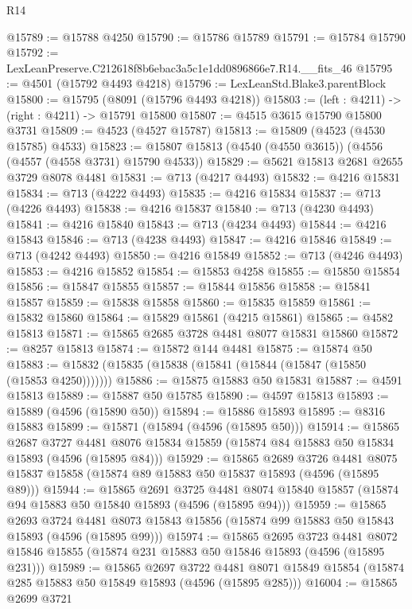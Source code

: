 \begin{lexlean}{R14}
\begin{coremodule}
@15789 := @15788 @4250
@15790 := @15786 @15789
@15791 := @15784 @15790
@15792 := LexLeanPreserve.C212618f8b6ebac3a5c1e1dd0896866e7.R14.__fits_46
@15795 := @4501 (@15792 @4493 @4218)
@15796 := LexLeanStd.Blake3.parentBlock
@15800 := @15795 (@8091 (@15796 @4493 @4218))
@15803 := (left : @4211) -> (right : @4211) -> @15791 @15800
@15807 := @4515 @3615 @15790 @15800 @3731
@15809 := @4523 (@4527 @15787)
@15813 := @15809 (@4523 (@4530 @15785) @4533)
@15823 := @15807 @15813 (@4540 (@4550 @3615)) (@4556 (@4557 (@4558 @3731) @15790 @4533))
@15829 := @5621 @15813 @2681 @2655 @3729 @8078 @4481
@15831 := @713 (@4217 @4493)
@15832 := @4216 @15831
@15834 := @713 (@4222 @4493)
@15835 := @4216 @15834
@15837 := @713 (@4226 @4493)
@15838 := @4216 @15837
@15840 := @713 (@4230 @4493)
@15841 := @4216 @15840
@15843 := @713 (@4234 @4493)
@15844 := @4216 @15843
@15846 := @713 (@4238 @4493)
@15847 := @4216 @15846
@15849 := @713 (@4242 @4493)
@15850 := @4216 @15849
@15852 := @713 (@4246 @4493)
@15853 := @4216 @15852
@15854 := @15853 @4258
@15855 := @15850 @15854
@15856 := @15847 @15855
@15857 := @15844 @15856
@15858 := @15841 @15857
@15859 := @15838 @15858
@15860 := @15835 @15859
@15861 := @15832 @15860
@15864 := @15829 @15861 (@4215 @15861)
@15865 := @4582 @15813
@15871 := @15865 @2685 @3728 @4481 @8077 @15831 @15860
@15872 := @8257 @15813
@15874 := @15872 @144 @4481
@15875 := @15874 @50
@15883 := @15832 (@15835 (@15838 (@15841 (@15844 (@15847 (@15850 (@15853 @4250)))))))
@15886 := @15875 @15883 @50 @15831
@15887 := @4591 @15813
@15889 := @15887 @50 @15785
@15890 := @4597 @15813
@15893 := @15889 (@4596 (@15890 @50))
@15894 := @15886 @15893
@15895 := @8316 @15883
@15899 := @15871 (@15894 (@4596 (@15895 @50)))
@15914 := @15865
    @2687
    @3727
    @4481
    @8076
    @15834
    @15859
    (@15874 @84 @15883 @50 @15834 @15893 (@4596 (@15895 @84)))
@15929 := @15865
    @2689
    @3726
    @4481
    @8075
    @15837
    @15858
    (@15874 @89 @15883 @50 @15837 @15893 (@4596 (@15895 @89)))
@15944 := @15865
    @2691
    @3725
    @4481
    @8074
    @15840
    @15857
    (@15874 @94 @15883 @50 @15840 @15893 (@4596 (@15895 @94)))
@15959 := @15865
    @2693
    @3724
    @4481
    @8073
    @15843
    @15856
    (@15874 @99 @15883 @50 @15843 @15893 (@4596 (@15895 @99)))
@15974 := @15865
    @2695
    @3723
    @4481
    @8072
    @15846
    @15855
    (@15874 @231 @15883 @50 @15846 @15893 (@4596 (@15895 @231)))
@15989 := @15865
    @2697
    @3722
    @4481
    @8071
    @15849
    @15854
    (@15874 @285 @15883 @50 @15849 @15893 (@4596 (@15895 @285)))
@16004 := @15865
    @2699
    @3721

\end{coremodule}
\end{lexlean}
